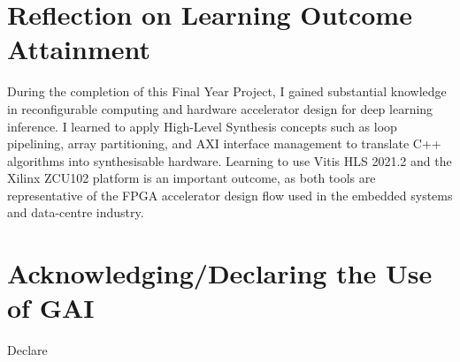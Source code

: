 \documentclass[12pt, a4paper]{extreport}
\newcommand{\frontmatter}{%
  \cleardoublepage
  \pagenumbering{roman}%
}
\newcommand{\mainmatter}{%
  \cleardoublepage
  \pagenumbering{arabic}%
}
\newcommand{\backmatter}{%
  \cleardoublepage
}
\begin{document}


\frontmatter

\tableofcontents






\listoffigures

\listoftables

\mainmatter








\backmatter

\chapter*{Reflection on Learning Outcome Attainment}

During the completion of this Final Year Project, I gained substantial knowledge in reconfigurable computing and hardware accelerator design for deep learning inference. I learned to apply High-Level Synthesis concepts such as loop pipelining, array partitioning, and AXI interface management to translate C++ algorithms into synthesisable hardware. Learning to use Vitis HLS 2021.2 and the Xilinx ZCU102 platform is an important outcome, as both tools are representative of the FPGA accelerator design flow used in the embedded systems and data-centre industry.

\chapter*{Acknowledging/Declaring the Use of GAI}
 
Declare 

\printbibliography[title={References}]


\end{document}
